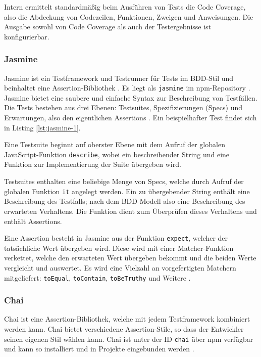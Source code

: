 Intern ermittelt standardmäßig beim Ausführen von Tests die Code Coverage, also die Abdeckung von Codezeilen, Funktionen, Zweigen und Anweisungen. Die Ausgabe sowohl von Code Coverage als auch der Testergebnisse ist konfigurierbar. \cite{intern-userguide}


\subsubsection{Jasmine}
\label{sec:Jasmine}
Jasmine ist ein Testframework und Testrunner für Tests im BDD-Stil und beinhaltet eine Assertion-Bibliothek \cite{jasmine-introduction}. Es liegt als \texttt{jasmine} im npm-Repository \cite{jasmine-getting-started}. Jasmine bietet eine saubere und einfache Syntax zur Beschreibung von Testfällen. Die Tests bestehen aus drei Ebenen: Testsuites, Spezifizierungen (\glqq Specs\grqq) und Erwartungen, also den eigentlichen Assertions \cite{jasmine-introduction}. Ein beispielhafter Test findet sich in Listing \ref{lst:jasmine-1}.

Eine Testsuite beginnt auf oberster Ebene mit dem Aufruf der globalen JavaScript-Funktion \texttt{describe}, wobei ein beschreibender String und eine Funktion zur Implementierung der Suite übergeben wird. \cite{jasmine-introduction}

Testsuites enthalten eine beliebige Menge von Specs, welche durch Aufruf der globalen Funktion \texttt{it} angelegt werden. Ein zu übergebender String enthält eine Beschreibung des Testfalls; nach dem BDD-Modell also eine Beschreibung des erwarteten Verhaltens. Die Funktion dient zum Überprüfen dieses Verhaltens und enthält Assertions. \cite{jasmine-introduction}

Eine Assertion besteht in Jasmine aus der Funktion \texttt{expect}, welcher der tatsächliche Wert übergeben wird. Diese wird mit einer Matcher-Funktion verkettet, welche den erwarteten Wert übergeben bekommt und die beiden Werte vergleicht und auswertet. Es wird eine Vielzahl an vorgefertigten Matchern mitgeliefert: \texttt{toEqual}, \texttt{toContain}, \texttt{toBeTruthy} und Weitere \cite{jasmine-introduction, jasmine-cheatsheet}.

\begin{figure}[H]
	
\end{figure}

\subsubsection{Chai}
\label{sec:Chai}
Chai ist eine Assertion-Bibliothek, welche mit jedem Testframework kombiniert werden kann. Chai bietet verschiedene Assertion-Stile, so dass der Entwickler seinen eigenen Stil wählen kann. \cite{chai-index} Chai ist unter der ID \texttt{chai} über npm verfügbar und kann so installiert und in Projekte eingebunden werden \cite{chai-installation}.

